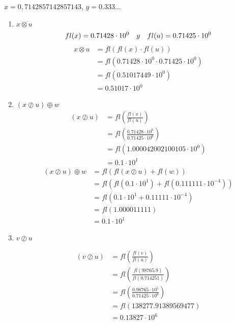 \documentclass[12pt]{article}
\begin{document}
$x = 0,7142857142857143$, $y = 0.333\dots$
\begin{enumerate}
    \item $x \otimes u$
    \[
    fl(x) = 0.71428 \cdot 10^{0} \quad y \quad fl(u) = 0.71425 \cdot 10^{0} \\
    \]
    \[
    \begin{aligned}
    x \otimes u &= fl(fl(x) \cdot fl(u)) \\
                &= fl(0.71428 \cdot 10^{0} \cdot 0.71425 \cdot 10^{0}) \\
                &= fl(0.51017449 \cdot 10^{0}) \\
                &= 0.51017 \cdot 10^{0}
    \end{aligned}
    \]

    \item $(x \oslash u) \oplus w$
    \[
    \begin{aligned}
        (x \oslash u) &= fl\left(\frac{fl(x)}{fl(u)}\right)\\
                    &= fl\left( \frac{0.71428\cdot 10^{0}}{0.71425 \cdot 10^{0}} \right)\\
                    &= fl(1.000042002100105\cdot 10^{0})\\
                    &= 0.1 \cdot 10^{1}
    \end{aligned}
    \]
    \[
    \begin{aligned}
        (x \oslash u) \oplus w &= fl(fl(x \oslash u) + fl(w))\\
                             &= fl(fl(0.1\cdot 10^{1}) + fl(0.111111\cdot10^{-4}))\\
                             &= fl(0.1\cdot 10^{1} + 0.11111\cdot10^{-4})\\
                             &= fl(1.000011111)\\
                             &= 0.1 \cdot 10^{1}
    \end{aligned}    
    \]

    \item $v \oslash u$
    
    \[
        \begin{aligned}
            (v \oslash u) &= fl\left(\frac{fl(v)}{fl(u)}\right)\\
                        &= fl\left( \frac{fl(98765.9)}{fl(0.714251)} \right)\\
                        &= fl\left( \frac{0.98765 \cdot 10^{5}}{0.71425 \cdot 10^{0}} \right)\\
                        &= fl(138277.91389569477)\\
                        &= 0.13827 \cdot 10^{6}
        \end{aligned}
    \]


\end{enumerate}
\end{document}
